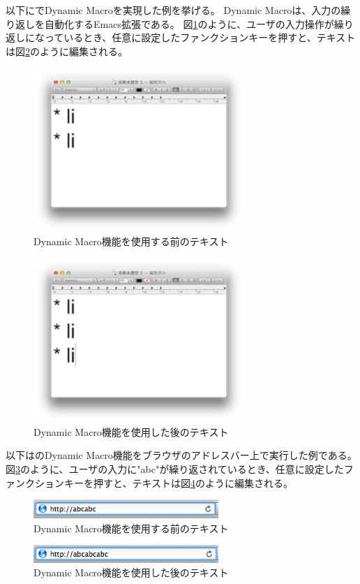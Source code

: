 以下に{\system}でDynamic Macro\cite{DynamicMacro}を実現した例を挙げる。
Dynamic Macroは、入力の繰り返しを自動化するEmacs拡張である。
図\ref{dynamic1}のように、ユーザの入力操作が繰り返しになっているとき、任意に設定したファンクションキーを押すと、テキストは図\ref{dynamic2}のように編集される。

\begin{figure}[H]
\centerline{\includegraphics[width=80mm,bb=0 0 360 190]{figures/dynamic1.png}}
\caption{Dynamic Macro機能を使用する前のテキスト}
\label{dynamic1}
\end{figure}

\begin{figure}[H]
\centerline{\includegraphics[width=80mm,bb=0 0 360 190]{figures/dynamic2.png}}
\caption{Dynamic Macro機能を使用した後のテキスト}
\label{dynamic2}
\end{figure}


以下は{\system}のDynamic Macro機能をブラウザのアドレスバー上で実行した例である。
図\ref{dynamic3}のように、ユーザの入力に"abc"が繰り返されているとき、任意に設定したファンクションキーを押すと、テキストは図\ref{dynamic4}のように編集される。

\begin{figure}[H]
\centerline{\includegraphics[width=70mm,bb=0 0 360 50]{figures/dynamic3.png}}
\caption{Dynamic Macro機能を使用する前のテキスト}
\label{dynamic3}
\end{figure}

\begin{figure}[H]
\centerline{\includegraphics[width=70mm,bb=0 0 360 50]{figures/dynamic4.png}}
\caption{Dynamic Macro機能を使用した後のテキスト}
\label{dynamic4}
\end{figure}



